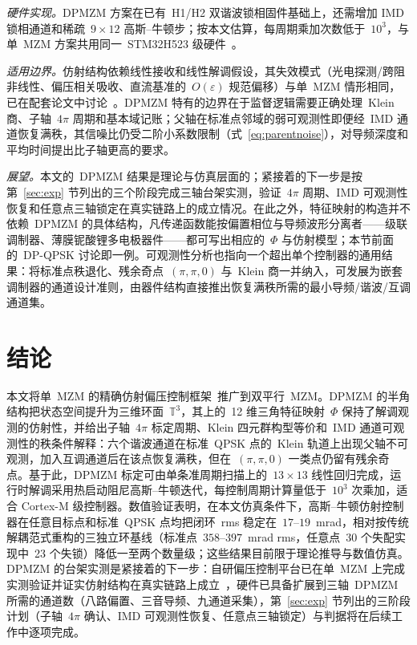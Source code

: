 \documentclass[11pt,journal,onecolumn]{IEEEtran}
\theoremstyle{plain}
\theoremstyle{remark}
\begin{document}
\emph{硬件实现。}DPMZM 方案在已有~H1/H2 双谐波锁相固件基础上，还需增加 IMD 锁相通道和稀疏~$9{\times}12$ 高斯--牛顿步；按本文估算，每周期乘加次数低于~$10^3$，与单~MZM 方案共用同一~STM32H523 级硬件~\cite{mzmaffine}。

\emph{适用边界。}仿射结构依赖线性接收和线性解调假设，其失效模式（光电探测/跨阻非线性、偏压相关吸收、直流基准的~$O(\varepsilon)$ 规范偏移）与单~MZM 情形相同，已在配套论文中讨论~\cite{mzmaffine}。DPMZM 特有的边界在于监督逻辑需要正确处理~Klein 商、子轴~$4\pi$ 周期和基本域记账；父轴在标准点邻域的弱可观测性即便经~IMD 通道恢复满秩，其信噪比仍受二阶小系数限制（式~\eqref{eq:parentnoise}），对导频深度和平均时间提出比子轴更高的要求。

\emph{展望。}本文的~DPMZM 结果是理论与仿真层面的；紧接着的下一步是按第~\ref{sec:exp} 节列出的三个阶段完成三轴台架实测，验证~$4\pi$ 周期、IMD 可观测性恢复和任意点三轴锁定在真实链路上的成立情况。在此之外，特征映射的构造并不依赖~DPMZM 的具体结构，凡传递函数能按偏置相位与导频波形分离者——级联调制器、薄膜铌酸锂多电极器件——都可写出相应的~$\Phi$ 与仿射模型；本节前面的~DP-QPSK 讨论即一例。可观测性分析也指向一个超出单个控制器的通用结果：将标准点秩退化、残余奇点~$(\pi,\pi,0)$ 与~Klein 商一并纳入，可发展为嵌套调制器的通道设计准则，由器件结构直接推出恢复满秩所需的最小导频/谐波/互调通道集。

\section{结论}
本文将单~MZM 的精确仿射偏压控制框架~\cite{mzmaffine}推广到双平行~MZM。DPMZM 的半角结构把状态空间提升为三维环面~$\mathbb{T}^3$，其上的~12 维三角特征映射~$\Phi$ 保持了解调观测的仿射性，并给出子轴~$4\pi$ 标定周期、Klein 四元群构型等价和~IMD 通道可观测性的秩条件解释：六个谐波通道在标准~QPSK 点的~Klein 轨道上出现父轴不可观测，加入互调通道后在该点恢复满秩，但在~$(\pi,\pi,0)$ 一类点仍留有残余奇点。基于此，DPMZM 标定可由单条准周期扫描上的~$13\times13$ 线性回归完成，运行时解调采用热启动阻尼高斯--牛顿迭代，每控制周期计算量低于~$10^3$ 次乘加，适合 Cortex-M 级控制器。数值验证表明，在本文仿真条件下，高斯--牛顿仿射控制器在任意目标点和标准~QPSK 点均把闭环~rms 稳定在~$17$--$19$~mrad，相对按传统解耦范式重构的三独立环基线（标准点~$358$--$397$~mrad rms，任意点~30 个失配实现中~23 个失锁）降低一至两个数量级；这些结果目前限于理论推导与数值仿真。DPMZM 的台架实测是紧接着的下一步：自研偏压控制平台已在单~MZM 上完成实测验证并证实仿射结构在真实链路上成立~\cite{mzmaffine}，硬件已具备扩展到三轴~DPMZM 所需的通道数（八路偏置、三音导频、九通道采集），第~\ref{sec:exp} 节列出的三阶段计划（子轴~$4\pi$ 确认、IMD 可观测性恢复、任意点三轴锁定）与判据将在后续工作中逐项完成。
\end{document}
